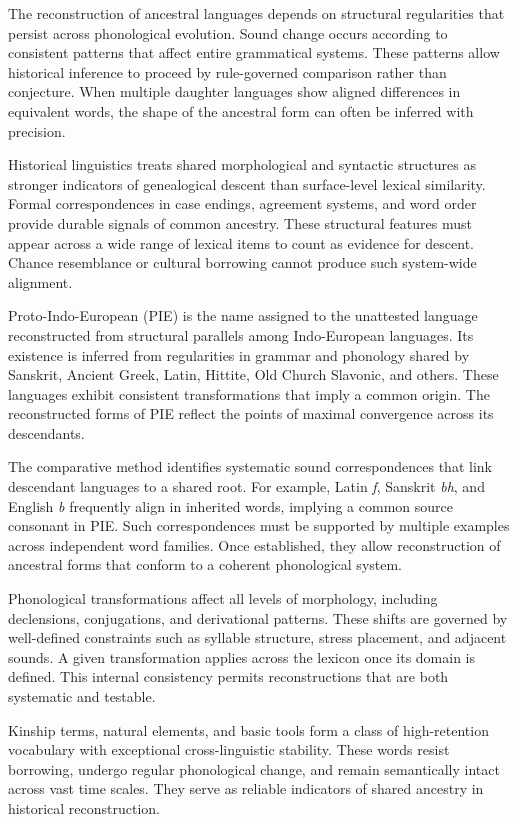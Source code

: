 The reconstruction of ancestral languages depends on structural regularities that persist across phonological evolution. Sound change occurs according to consistent patterns that affect entire grammatical systems. These patterns allow historical inference to proceed by rule-governed comparison rather than conjecture. When multiple daughter languages show aligned differences in equivalent words, the shape of the ancestral form can often be inferred with precision.

Historical linguistics treats shared morphological and syntactic structures as stronger indicators of genealogical descent than surface-level lexical similarity. Formal correspondences in case endings, agreement systems, and word order provide durable signals of common ancestry. These structural features must appear across a wide range of lexical items to count as evidence for descent. Chance resemblance or cultural borrowing cannot produce such system-wide alignment.

Proto-Indo-European (PIE) is the name assigned to the unattested language reconstructed from structural parallels among Indo-European languages. Its existence is inferred from regularities in grammar and phonology shared by Sanskrit, Ancient Greek, Latin, Hittite, Old Church Slavonic, and others. These languages exhibit consistent transformations that imply a common origin. The reconstructed forms of PIE reflect the points of maximal convergence across its descendants.

The comparative method identifies systematic sound correspondences that link descendant languages to a shared root. For example, Latin \emph{f}, Sanskrit \emph{bh}, and English \emph{b} frequently align in inherited words, implying a common source consonant in PIE. Such correspondences must be supported by multiple examples across independent word families. Once established, they allow reconstruction of ancestral forms that conform to a coherent phonological system.

Phonological transformations affect all levels of morphology, including declensions, conjugations, and derivational patterns. These shifts are governed by well-defined constraints such as syllable structure, stress placement, and adjacent sounds. A given transformation applies across the lexicon once its domain is defined. This internal consistency permits reconstructions that are both systematic and testable.

Kinship terms, natural elements, and basic tools form a class of high-retention vocabulary with exceptional cross-linguistic stability. These words resist borrowing, undergo regular phonological change, and remain semantically intact across vast time scales. They serve as reliable indicators of shared ancestry in historical reconstruction.

